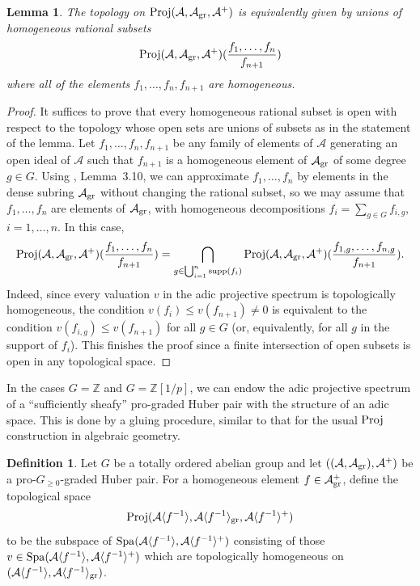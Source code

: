 \documentclass[12pt,twoside,a4paper]{article}
\newtheorem{lemma}[thm]{Lemma}
\theoremstyle{definition}
\newtheorem{mydef}[thm]{Definition}
\theoremstyle{remark}
\newcommand\gr{{\rm gr}}
\newcommand\Proj{{\rm Proj}}
\newcommand\Spa{{\rm Spa}}
\newcommand\supp{{\rm supp}}
\begin{document}
\begin{lemma}\label{Topology on Proj}The topology on $\Proj(\mathcal{A}, \mathcal{A}_{\gr}, \mathcal{A}^{+})$ is equivalently given by unions of homogeneous rational subsets \begin{equation*}\Proj(\mathcal{A}, \mathcal{A}_{\gr}, \mathcal{A}^{+})(\frac{f_1,\dots, f_n}{f_{n+1}})\end{equation*}where all of the elements $f_{1}, \dots, f_{n}, f_{n+1}$ are homogeneous. \end{lemma}
\begin{proof}It suffices to prove that every homogeneous rational subset is open with respect to the topology whose open sets are unions of subsets as in the statement of the lemma. Let $f_1,\dots, f_n, f_{n+1}$ be any family of elements of $\mathcal{A}$ generating an open ideal of $\mathcal{A}$ such that $f_{n+1}$ is a homogeneous element of $\mathcal{A}_{\gr}$ of some degree $g\in G$. Using \cite{Huber1}, Lemma~3.10, we can approximate $f_1,\dots, f_n$ by elements in the dense subring $\mathcal{A}_{\gr}$ without changing the rational subset, so we may assume that $f_1,\dots, f_n$ are elements of $\mathcal{A}_{\gr}$, with homogeneous decompositions $f_{i}=\sum_{g\in G}f_{i, g}$, $i=1,\dots, n$. In this case, \begin{equation*}\Proj(\mathcal{A}, \mathcal{A}_{\gr}, \mathcal{A}^{+})(\frac{f_{1},\dots, f_{n}}{f_{n+1}})=\bigcap_{g\in \bigcup_{i=1}^{n}\supp(f_{i})}\Proj(\mathcal{A}, \mathcal{A}_{\gr}, \mathcal{A}^{+})(\frac{f_{1, g},\dots, f_{n, g}}{f_{n+1}}).\end{equation*}Indeed, since every valuation $v$ in the adic projective spectrum is topologically homogeneous, the condition $v(f_{i})\leq v(f_{n+1})\neq0$ is equivalent to the condition $v(f_{i, g})\leq v(f_{n+1})$ for all $g\in G$ (or, equivalently, for all $g$ in the support of $f_{i}$). This finishes the proof since a finite intersection of open subsets is open in any topological space. \end{proof}
In the cases $G=\mathbb{Z}$ and $G=\mathbb{Z}[1/p]$, we can endow the adic projective spectrum of a ``sufficiently sheafy'' pro-graded Huber pair with the structure of an adic space. This is done by a gluing procedure, similar to that for the usual $\Proj$ construction in algebraic geometry.
\begin{mydef}\label{Fake adic Proj}Let $G$ be a totally ordered abelian group and let $((\mathcal{A}, \mathcal{A}_{\gr}), \mathcal{A}^{+})$ be a pro-$G_{\geq0}$-graded Huber pair. For a homogeneous element $f\in \mathcal{A}_{\gr}^{+}$, define the topological space \begin{equation*}\Proj(\mathcal{A}\langle f^{-1}\rangle, \mathcal{A}\langle f^{-1}\rangle_{\gr}, \mathcal{A}\langle f^{-1}\rangle^{+})\end{equation*}to be the subspace of $\Spa(\mathcal{A}\langle f^{-1}\rangle, \mathcal{A}\langle f^{-1}\rangle^{+})$ consisting of those $v\in \Spa(\mathcal{A}\langle f^{-1}\rangle, \mathcal{A}\langle f^{-1}\rangle^{+})$ which are topologically homogeneous on $(\mathcal{A}\langle f^{-1}\rangle, \mathcal{A}\langle f^{-1}\rangle_{\gr})$.\end{mydef}
\end{document}
